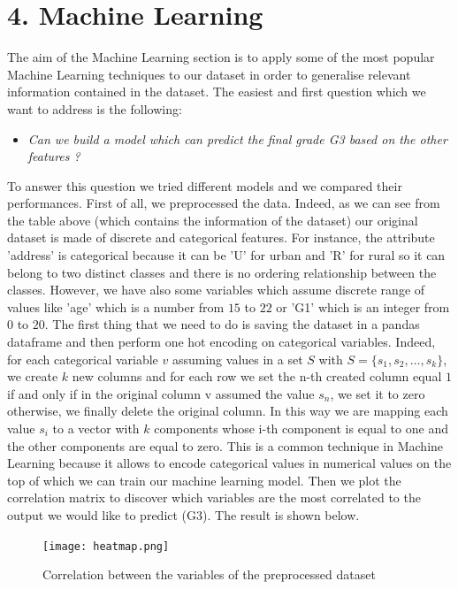 \documentclass[a4paper, 11pt]{report}
\theoremstyle{definition}
\numberwithin{equation}{section}		%
\numberwithin{figure}{section}			%
\numberwithin{table}{section}				%
\begin{document}
\section*{4. Machine Learning}
The aim of the Machine Learning section is to apply some of the most popular Machine Learning techniques to our dataset in order to generalise relevant information contained in the dataset.
The easiest and first question which we want to address is the following:
\begin{itemize}
\item \textit{Can we build a model which can predict the final grade G3 based on the other features ?}
\end{itemize}
To answer this question we tried different models and we compared their performances. First of all, we preprocessed the data. Indeed, as we can see from the table above (which contains the information of the dataset) our original dataset is made of discrete and categorical features. For instance, the attribute 'address' is categorical because it can be 'U' for urban and 'R' for rural so it can belong to two distinct classes and there is no ordering relationship between the classes. However, we have also some variables which assume discrete range of values like 'age' which is a number from $15$ to $22$ or 'G1' which is an integer from $0$ to $20$. The first thing that we need to do is saving the dataset in a pandas dataframe and then perform one hot encoding on categorical variables. Indeed, for each categorical variable $v$ assuming values in a set $S$ with $S=\{s_1,s_2,\dots, s_k\}$, we create $k$ new columns and for each row we set the n-th created column equal $1$ if and only if in the original column v assumed the value $s_n$, we set it to zero otherwise, we finally delete the original column. In this way we are mapping each value $s_i$ to a vector with $k$ components whose i-th component is equal to one and the other components are equal to zero. This is a common technique in Machine Learning because it allows to encode categorical values in numerical values on the top of which we can train our machine learning model. Then we plot the correlation matrix to discover which variables are the most correlated to the output we would like to predict (G3). The result is shown below.
\begin{figure}[h]\centering
\texttt{[image: heatmap.png]}
\caption{Correlation between the variables of the preprocessed dataset}
\end{figure}
\end{document}
